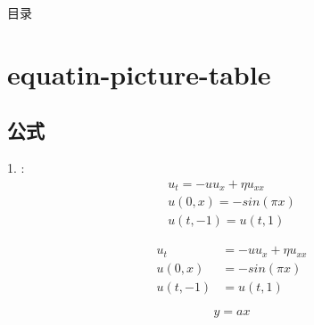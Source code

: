 \begin{frame}[noframenumbering]
\titlepage
\date{\today}
\end{frame}

\begin{frame}[noframenumbering]{目录}


\tableofcontents[hideallsubsections]%
\end{frame}


\section{equatin-picture-table}
\subsection{公式}
\begin{frame}{1. \secname: \subsecname}
	\begin{gather}
		u_t = -uu_x+\eta u_{xx}\\
		u(0,x)=-sin(\pi x)\\
		u(t,-1) = u(t, 1)
	\end{gather}

		\begin{align}
		u_t &= -uu_x+\eta u_{xx}\\
		u(0,x) &=-sin(\pi x)\\
		u(t,-1) & = u(t, 1)
	\end{align}
	
	$$ y =a x$$


\end{frame}

